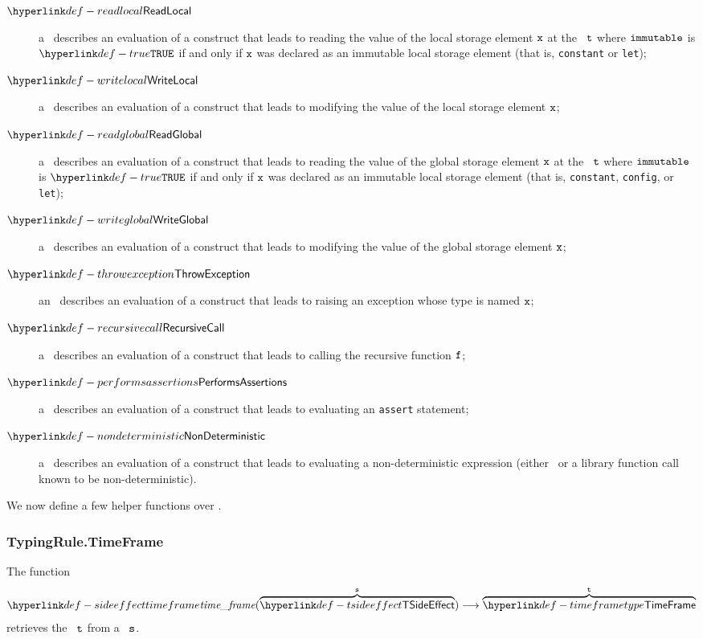 \begin{description}
    \item[$\ReadLocal$] a \ReadLocalTerm\ describes an evaluation of a construct that leads to reading the value of the local storage element
        $\texttt{x}$ at the \timeframeterm\ $\texttt{t}$ where $\texttt{immutable}$ is $\True$ if and only if $\texttt{x}$
        was declared as an immutable local storage element (that is, \texttt{constant} or \texttt{let});
    \hypertarget{def-writelocalterm}{}
    \item[$\WriteLocal$] a \WriteLocalTerm\ describes an evaluation of a construct that leads to modifying the value of the local storage element
        $\texttt{x}$;
    \hypertarget{def-readglobalterm}{}
    \item[$\ReadGlobal$] a \ReadGlobalTerm\ describes an evaluation of a construct that leads to reading the value of the global storage element
        $\texttt{x}$ at the \timeframeterm\ $\texttt{t}$ where $\texttt{immutable}$ is $\True$ if and only if $\texttt{x}$
        was declared as an immutable local storage element (that is, \texttt{constant}, \texttt{config}, or \texttt{let});
    \hypertarget{def-writeglobalterm}{}
    \item[$\WriteGlobal$] a \WriteGlobalTerm\ describes an evaluation of a construct that leads to modifying the value of the global storage element
        $\texttt{x}$;
    \hypertarget{def-throwexceptionterm}{}
    \item[$\ThrowException$] an \ThrowExceptionTerm\ describes an evaluation of a construct that leads to raising an exception whose type
        is named $\texttt{x}$;
    \hypertarget{def-recursivecallterm}{}
    \item[$\RecursiveCall$] a \RecursiveCallTerm\ describes an evaluation of a construct that leads to calling the recursive function $\texttt{f}$;
    \hypertarget{def-performsassertionsterm}{}
    \item[$\PerformsAssertions$] a \PerformsAssertionsTerm\ describes an evaluation of a construct that leads to evaluating an \texttt{assert} statement;
    \hypertarget{def-nondeterministicterm}{}
    \item[$\NonDeterministic$] a \NonDeterministicTerm\ describes an evaluation of a construct that leads to evaluating a non-deterministic
        expression (either \ARBITRARY\ or a library function call known to be non-deterministic).
\end{description}

We now define a few helper functions over \timeframesterm.

\subsubsection{TypingRule.TimeFrame\label{sec:TypingRule.TimeFrame}}
\hypertarget{def-sideeffecttimeframe}{}
The function
\[
    \timeframe(\overname{\TSideEffect}{\vs}) \aslto \overname{\TTimeFrame}{\vt}
\]
retrieves the \timeframeterm\ $\texttt{t}$ from a \sideeffectdescriptorterm\ $\texttt{s}$.

